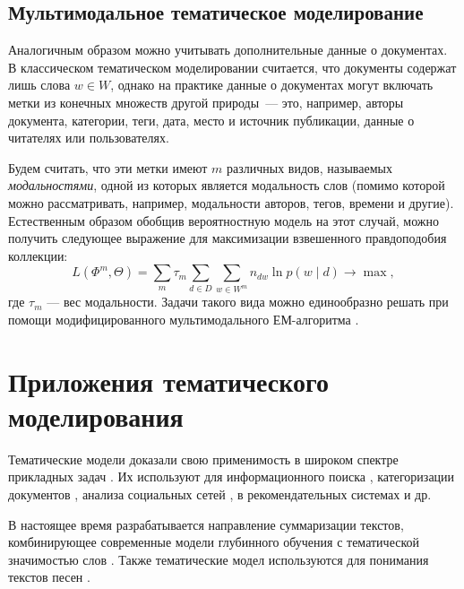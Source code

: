 \subsection{Мультимодальное тематическое моделирование}

Аналогичным образом можно учитывать дополнительные данные о документах.
В классическом тематическом моделировании считается, что документы содержат лишь слова $w \in W$, однако на практике данные о документах могут включать метки из конечных множеств другой природы~--- это, например, авторы документа, категории, теги, дата, место и источник публикации, данные о читателях или пользователях.

Будем считать, что эти метки имеют $m$ различных видов, называемых  \textit{модальностями}, одной из которых является модальность слов (помимо которой можно рассматривать, например, модальности авторов, тегов, времени и другие). Естественным образом обобщив вероятностную модель на этот случай, можно получить следующее выражение для максимизации взвешенного правдоподобия коллекции:
\[
    L(\Phi^m, \Theta) = \sum_m \tau_m \sum_{d\in D} \sum_{w \in W^m} n_{dw} \ln p(w \mid d) \rightarrow \max,
\]
где $\tau_m$ --- вес модальности.
Задачи такого вида можно единообразно решать при помощи модифицированного мультимодального ЕМ-алгоритма \cite{voron15nonbayesian}.

\section{Приложения тематического моделирования}


Тематические модели доказали свою применимость в широком спектре прикладных задач \cite{fntir2017applications}. Их используют для информационного поиска \cite{yi2009, wang2011}, категоризации документов \cite{rubin2012}, анализа социальных сетей \cite{varshney2014, pinto2016}, в рекомендательных системах \cite{wang2011,lee2015} и др.

В настоящее время разрабатывается направление суммаризации текстов, комбинирующее современные модели глубинного обучения с тематической значимостью слов \cite{narayan2018don,wang2018reinforced,lebanoff-etal-2019-scoring}. Также тематические модел используются для понимания текстов песен \cite{choi2015topic,fell2019song,watanabe2018modeling}. 

